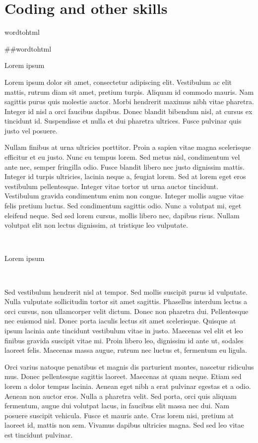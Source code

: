 \documentclass[
]{book}
\begin{document}
\hypertarget{coding-and-other-skills}{%
\chapter{Coding and other skills}\label{coding-and-other-skills}}

wordtohtml

\#\#wordtohtml

Lorem ipsum

Lorem ipsum dolor sit amet, consectetur adipiscing elit. Vestibulum ac elit mattis, rutrum diam sit amet, pretium turpis. Aliquam id commodo mauris. Nam sagittis purus quis molestie auctor. Morbi hendrerit maximus nibh vitae pharetra. Integer id nisl a orci faucibus dapibus. Donec blandit bibendum nisl, at cursus ex tincidunt id. Suspendisse et nulla et dui pharetra ultrices. Fusce pulvinar quis justo vel posuere.

Nullam finibus at urna ultricies porttitor. Proin a sapien vitae magna scelerisque efficitur et eu justo. Nunc eu tempus lorem. Sed metus nisl, condimentum vel ante nec, semper fringilla odio. Fusce blandit libero nec justo dignissim mattis. Integer id turpis ultricies, lacinia neque a, feugiat lorem. Sed at lorem eget eros vestibulum pellentesque. Integer vitae tortor ut urna auctor tincidunt. Vestibulum gravida condimentum enim non congue. Integer mollis augue vitae felis pretium luctus. Sed condimentum sagittis odio. Nunc a volutpat mi, eget eleifend neque. Sed sed lorem cursus, mollis libero nec, dapibus risus. Nullam volutpat elit non lectus dignissim, at tristique leo vulputate.

{~}

{Lorem ipsum}

{~}

Sed vestibulum hendrerit nisl at tempor. Sed mollis suscipit purus id vulputate. Nulla vulputate sollicitudin tortor sit amet sagittis. Phasellus interdum lectus a orci cursus, non ullamcorper velit dictum. Donec non pharetra dui. Pellentesque nec euismod nisl. Donec porta iaculis lectus sit amet scelerisque. Quisque at ipsum lacinia ante tincidunt vestibulum vitae in justo. Maecenas vel elit et leo finibus gravida suscipit vitae mi. Proin libero leo, dignissim id ante ut, sodales laoreet felis. Maecenas massa augue, rutrum nec luctus et, fermentum eu ligula.

Orci varius natoque penatibus et magnis dis parturient montes, nascetur ridiculus mus. Donec pellentesque sagittis laoreet. Maecenas at quam neque. Etiam sed lorem a dolor tempus lacinia. Aenean eget nibh a erat pulvinar egestas et a odio. Aenean non auctor eros. Nulla a pharetra velit. Sed porta, orci quis aliquam fermentum, augue dui volutpat lacus, in faucibus elit massa nec dui. Nam posuere suscipit vehicula. Fusce et mauris ante. Cras lorem nisi, pretium at laoreet id, mattis non sem. Vivamus dapibus ultricies magna. Sed sed leo vitae est tincidunt pulvinar.
\end{document}
